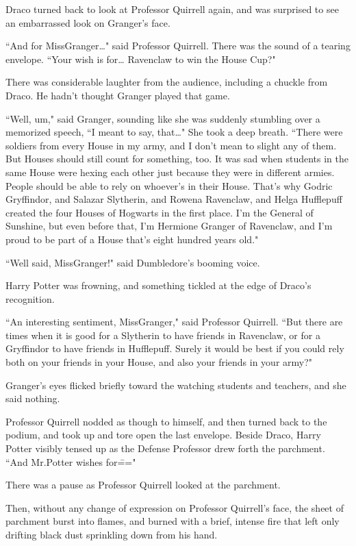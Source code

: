 Draco turned back to look at Professor Quirrell again, and was surprised to see an embarrassed look on Granger's face.

``And for Miss\?Granger{\ldots}" said Professor Quirrell. There was the sound of a tearing envelope. ``Your wish is for{\ldots} Ravenclaw to win the House Cup?"

There was considerable laughter from the audience, including a chuckle from Draco. He hadn't thought Granger played that game.

``Well, um," said Granger, sounding like she was suddenly stumbling over a memorized speech, ``I meant to say, that{\ldots}" She took a deep breath. ``There were soldiers from every House in my army, and I don't mean to slight any of them. But Houses should still count for something, too. It was sad when students in the same House were hexing each other just because they were in different armies. People should be able to rely on whoever's in their House. That's why Godric Gryffindor, and Salazar Slytherin, and Rowena Ravenclaw, and Helga Hufflepuff created the four Houses of Hogwarts in the first place. I'm the General of Sunshine, but even before that, I'm Hermione Granger of Ravenclaw, and I'm proud to be part of a House that's eight hundred years old."

``Well said, Miss\?Granger!" said Dumbledore's booming voice.

Harry Potter was frowning, and something tickled at the edge of Draco's recognition.

``An interesting sentiment, Miss\?Granger," said Professor Quirrell. ``But there are times when it is good for a Slytherin to have friends in Ravenclaw, or for a Gryffindor to have friends in Hufflepuff. Surely it would be best if you could rely both on your friends in your House, and also your friends in your army?"

Granger's eyes flicked briefly toward the watching students and teachers, and she said nothing.

Professor Quirrell nodded as though to himself, and then turned back to the podium, and took up and tore open the last envelope. Beside Draco, Harry Potter visibly tensed up as the Defense Professor drew forth the parchment. ``And Mr.\?Potter wishes for\==="

There was a pause as Professor Quirrell looked at the parchment.

Then, without any change of expression on Professor Quirrell's face, the sheet of parchment burst into flames, and burned with a brief, intense fire that left only drifting black dust sprinkling down from his hand.

